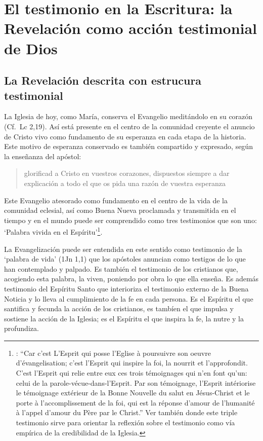 \section{El testimonio en la Escritura: la Revelación como acción testimonial de Dios}

\subsection{La Revelación descrita con estrucura testimonial}

La Iglesia de hoy, como María, conserva el Evangelio meditándolo en su corazón (Cf.~Lc 2,19). Así está presente en el centro de la comunidad creyente el anuncio de Cristo vivo como fundamento de su esperanza en cada etapa de la historia. Este motivo de esperanza conservado es también compartido y expresado, según la enseñanza del apóstol: \blockquote[][\,(1Pe 3,15)]{glorificad a Cristo en vuestros corazones, dispuestos siempre a dar explicación a todo el que os pida una razón de vuestra esperanza}.

Este Evangelio atesorado como fundamento en el centro de la vida de la comunidad eclesial, así como Buena Nueva proclamada y transmitida en el tiempo y en el mundo puede ser comprendido como tres testimonios que son uno: \enquote*{Palabra vivida en el Espíritu}\footnote{\cite[Cf.~][110]{latourelle1975et}: \enquote{Car c'est L'Esprit qui posse l'Eglise à poursuivre son oeuvre d'évangelisation; c'est l'Esprit qui inspire la foi, la nourrit et l'approfondit. C'est l'Esprit qui relie entre eux ces trois témoignages qui n'en font qu'un: celui de la parole-vécue-dans-l'Esprit. Par son témoignage, l'Esprit intériorise le témoignage extérieur de la Bonne Nouvelle du salut en Jésus-Christ et le porte à l'accomplissement de la foi, qui est la réponse d'amour de l'humanité à l'appel d'amour du Père par le Christ.} Ver también \cite[582]{ninot2009tf} donde este triple testimonio sirve para orientar la reflexión sobre el testimonio como vía empírica de la credibilidad de la Iglesia.}.

La Evangelización puede ser entendida en este sentido como testimonio de la `palabra de vida' (1Jn 1,1) que los apóstoles anuncian como testigos de lo que han contemplado y palpado. Es también el testimonio de los cristianos que, acogiendo esta palabra, la viven, poniendo por obra lo que ella enseña. Es además testimonio del Espíritu Santo que interioriza el testimonio externo de la Buena Noticia y lo lleva al cumplimiento de la fe en cada persona\autocite[Cf.~][110]{latourelle1975et}. Es el Espíritu el que santifica y fecunda la acción de los cristianos, es tambíen el que impulsa y sostiene la acción de la Iglesia; es el Espíritu el que inspira la fe, la nutre y la profundiza\autocite[Cf.~][110]{latourelle1975et}.


